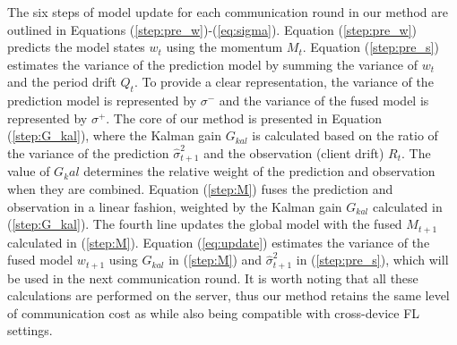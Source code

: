 
The six steps of model update for each communication round in our method are outlined in Equations (\ref{step:pre_w})-(\ref{eq:sigma}). Equation (\ref{step:pre_w}) predicts the model states $w_t$ using the momentum $M_t$. Equation (\ref{step:pre_s}) estimates the variance of the prediction model by summing the variance of $w_t$ and the period drift $Q_t$. To provide a clear representation, the variance of the prediction model is represented by $\sigma^-$ and the variance of the fused model is represented by $\sigma^+$. The core of our method is presented in Equation (\ref{step:G_kal}), where the Kalman gain $G_{kal}$ is calculated based on the ratio of the variance of the prediction $\hat{\sigma}^2_{t+1}$ and the observation (client drift) ${R_t}$. 
The value of $G_kal$ determines the relative weight of the prediction and observation when they are combined. Equation (\ref{step:M}) fuses the prediction and observation in a linear fashion, weighted by the Kalman gain $G_{kal}$ calculated in (\ref{step:G_kal}). The fourth line updates the global model with the fused $M_{t+1}$ calculated in (\ref{step:M}). Equation (\ref{eq:update}) estimates the variance of the fused model $w_{t+1}$ using $G_{kal}$ in (\ref{step:M}) and $\hat{\sigma}^2_{t+1}$ in (\ref{step:pre_s}), which will be used in the next communication round. It is worth noting that all these calculations are performed on the server, thus our method retains the same level of communication cost as \fedavg while also being compatible with cross-device FL settings.




